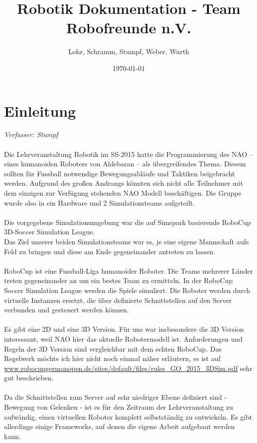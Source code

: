 \documentclass[fontsize=12pt,a4paper,final]{scrartcl}[2003/01/01]
\title{Robotik Dokumentation - Team Robofreunde n.V.}
\author{Lohr, Schramm, Stumpf, Weber, Wurth}
\date{\today}
\begin{document}
\maketitle
\tableofcontents

\section{Einleitung}\label{se:Einleitung}
\textit{Verfasser: Stumpf}\\
\\
Die Lehrveranstaltung Robotik im SS-2015 hatte die Programmierung des NAO -- eines humanoiden Roboters von Aldebaran -- als übergreifendes Thema. Diesem sollten für Fussball notwendige Bewegungsabläufe und Taktiken beigebracht werden. Aufgrund des großen Andrangs könnten sich nicht alle Teilnehmer mit dem einzigen zur Verfügung stehenden NAO Modell beschäftigen. Die Gruppe wurde also in ein Hardware und 2 Simulationsteams aufgeteilt.\\
\\
Die vorgegebene Simulationumgebung war die auf Simspark basierende RoboCup 3D-Soccer Simulation League.\\
Das Ziel unserer beiden Simulationsteams war es, je eine eigene Mannschaft aufs Feld zu bringen und diese am Ende gegeneinander antreten zu lassen.\\
\\
RoboCup ist eine Fussball-Liga humanoider Roboter. Die Teams mehrerer Länder treten gegeneinander an um ein bestes Team zu ermitteln. In der RoboCup Soccer Simulation League werden die Spiele simuliert. Die Roboter werden durch virtuelle Instanzen ersetzt, die über definierte Schnittstellen auf den Server verbunden und gesteuert werden können.\\
\\
Es gibt eine 2D und eine 3D Version. Für uns war insbesondere die 3D Version interessant, weil NAO hier das aktuelle Robotermodell ist. Anforderungen und Regeln der 3D Version sind vergleichbar mit dem echten RoboCup. Das Regelwerk möchte ich hier nicht noch einmal näher erläutern, es ist auf \\
\href{www.robocupgermanopen.de/sites/default/files/rules_GO_2015_3DSim.pdf}{www.robocupgermanopen.de/sites/default/files/rules\_GO\_2015\_3DSim.pdf} sehr gut beschrieben.\\
\\
Da die Schnittstellen zum Server auf sehr niedriger Ebene definiert sind - Bewegung von Gelenken - ist es für den Zeitraum der Lehrveranstaltung zu aufwändig, einen virtuellen Roboter komplett selbstständig zu entwickeln. Es gibt allerdings einige Frameworks, auf denen die eigene Arbeit aufgebaut werden kann.
\end{document}
